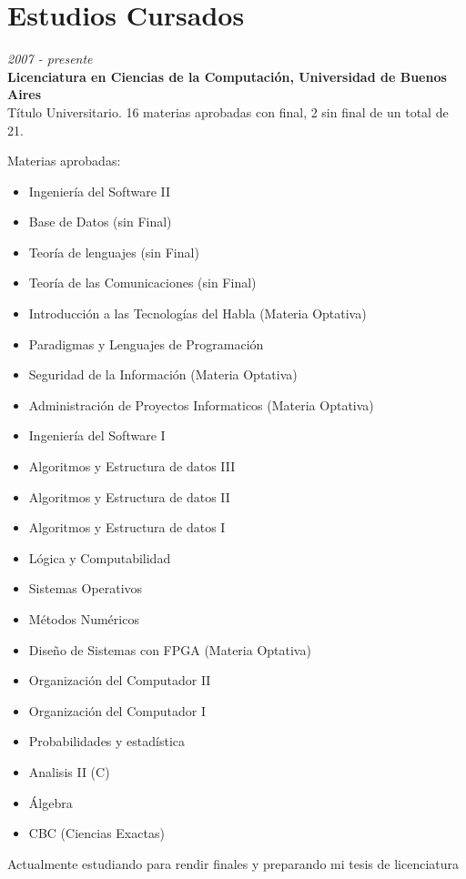 \section{Estudios Cursados}

\begin{large}\textit{2007 - presente}\\
	   \textbf{Licenciatura en Ciencias de la Computación, Universidad de Buenos Aires}\\
	  Título Universitario. 16 materias aprobadas con final, 2 sin final de un total de 21.\\
\end{large}
Materias aprobadas:
\begin{multicols}{2}
\begin{itemize}
    \item Ingeniería del Software II
    \item Base de Datos (sin Final)
    \item Teoría de lenguajes (sin Final)
    \item Teoría de las Comunicaciones (sin Final)
    \item Introducción a las Tecnologías del Habla (Materia Optativa)
    \item Paradigmas y Lenguajes de Programación
    \item Seguridad de la Información (Materia Optativa)
    \item Administración de Proyectos Informaticos (Materia Optativa)
    \item Ingeniería del Software I
    \item Algoritmos y Estructura de datos III
    \item Algoritmos y Estructura de datos II
    \item Algoritmos y Estructura de datos I
    \item Lógica y Computabilidad
    \item Sistemas Operativos
    \item Métodos Numéricos
    \item Diseño de Sistemas con FPGA (Materia Optativa)
    \item Organización del Computador II
    \item Organización del Computador I
    \item Probabilidades y estadística
    \item Analisis II (C)
    \item Álgebra
    \item CBC (Ciencias Exactas)
\end{itemize}
\end{multicols}

\noindent Actualmente estudiando para rendir finales y preparando mi tesis de licenciatura


